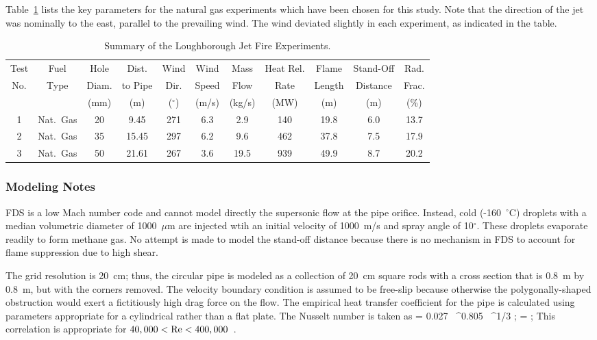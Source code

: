 Table~\ref{Loughborough_Parameters} lists the key parameters for the natural gas experiments which have been chosen for this study. Note that the direction of the jet was nominally to the east, parallel to the prevailing wind. The wind deviated slightly in each experiment, as indicated in the table.

\begin{table}[!ht]
\caption[Summary of the Loughborough Jet Fire Experiments]{Summary of the Loughborough Jet Fire Experiments.}
\begin{tabular}{|c|c|c|c|c|c|c|c|c|c|c|}
\hline
Test    & Fuel     & Hole  & Dist.    & Wind          & Wind    & Mass   & Heat Rel.    & Flame     & Stand-Off  & Rad.      \\
No.     & Type     & Diam. & to Pipe  & Dir.          & Speed   & Flow   & Rate         & Length    & Distance   & Frac.     \\ 
        &          & (mm)  & (m)      & ($^\circ$)    & (m/s)   & (kg/s) & (MW)         & (m)       & (m)        & (\%)      \\ \hline
1       & Nat.~Gas & 20    & 9.45     & 271           & 6.3     & 2.9    & 140          & 19.8      & 6.0        & 13.7      \\
2       & Nat.~Gas & 35    & 15.45    & 297           & 6.2     & 9.6    & 462          & 37.8      & 7.5        & 17.9      \\
3       & Nat.~Gas & 50    & 21.61    & 267           & 3.6     & 19.5   & 939          & 49.9      & 8.7        & 20.2      \\ \hline
\end{tabular}
\label{Loughborough_Parameters}
\end{table}

\subsubsection{Modeling Notes}

FDS is a low Mach number code and cannot model directly the supersonic flow at the pipe orifice. Instead, cold (-160~$^\circ$C) droplets with a median volumetric diameter of 1000~$\mu$m are injected wtih an initial velocity of 1000~m/s and spray angle of 10$^\circ$. These droplets evaporate readily to form methane gas. No attempt is made to model the stand-off distance because there is no mechanism in FDS to account for flame suppression due to high shear.

The grid resolution is 20~cm; thus, the circular pipe is modeled as a collection of 20~cm square rods with a cross section that is 0.8~m by 0.8~m, but with the corners removed. The velocity boundary condition is assumed to be free-slip because otherwise the polygonally-shaped obstruction would exert a fictitiously high drag force on the flow. The empirical heat transfer coefficient for the pipe is calculated using parameters appropriate for a cylindrical rather than a flat plate. The Nusselt number is taken as 
\be
   \NU = 0.027 \, \RE^{0.805} \, \PR^{1/3} \quad ; \quad \RE =  \quad ; \quad {}
\ee
This correlation is appropriate for $40,000 < \hbox{Re} < 400,000$~\cite{Incropera:1}.

